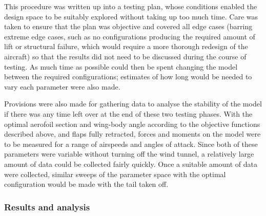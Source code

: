 \documentclass[../../main.tex]{subfiles}
\begin{document}
This procedure was written up into a testing plan, whose conditions enabled the design space to be suitably explored without taking up too much time.
Care was taken to ensure that the plan was objective and covered all edge cases (barring extreme edge cases, such as no configurations producing the required amount of lift or structural failure, which would require a more thorough redesign of the aircraft) so that the results did not need to be discussed during the course of testing.
As much time as possible could then be spent changing the model between the required configurations; estimates of how long would be needed to vary each parameter were also made.

Provisions were also made for gathering data to analyse the stability of the model if there was any time left over at the end of these two testing phases.
With the optimal aerofoil section and wing-body angle according to the objective functions described above, and flaps fully retracted, forces and moments on the model were to be measured for a range of airspeeds and angles of attack.
Since both of these parameters were variable without turning off the wind tunnel, a relatively large amount of data could be collected fairly quickly.
Once a suitable amount of data were collected, similar sweeps of the parameter space with the optimal configuration would be made with the tail taken off.

\subsubsection{Results and analysis} \label{sec:design-process:interim-design-review:wind-tunnel-test:results-and-analysis}
\end{document}
